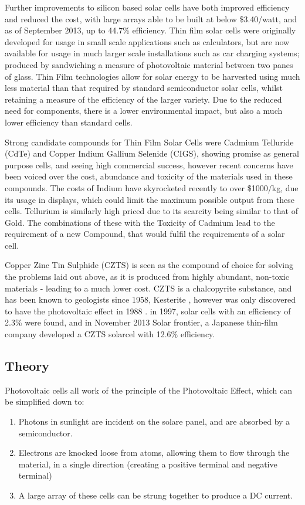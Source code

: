 Further improvements to silicon based solar cells have both improved efficiency and reduced the cost, with large arrays able to be built at below \$3.40/watt\citep{Fraunhofer-Gesellschaft2014}, and as of September 2013, up to 44.7\% efficiency.\citep{Ausick2014} Thin film solar cells were originally developed for usage in small scale applications such as calculators, but are now available for usage in much larger scale installations such as car charging systems; produced by sandwiching a measure of photovoltaic material between two panes of glass. Thin Film technologies allow for solar energy to be harvested using much less material than that required by standard semiconductor solar cells, whilst retaining a measure of the efficiency of the larger variety. Due to the reduced need for components, there is a lower environmental impact, but also a much lower efficiency than standard cells.

Strong candidate compounds for Thin Film Solar Cells were Cadmium Telluride (CdTe) and Copper Indium Gallium Selenide (CIGS), showing promise as general purpose cells, and seeing high commercial success, however recent concerns have been voiced over the cost, abundance and toxicity of the materials used in these compounds. The costs of Indium have skyrocketed recently to over \$1000/kg, due its usage in displays, which could limit the maximum possible output from these cells. Tellurium is similarly high priced due to its scarcity being similar to that of Gold. The combinations of these with the Toxicity of Cadmium lead to the requirement of a new Compound, that would fulfil the requirements of a solar cell.

Copper Zinc Tin Sulphide (CZTS) is seen as the compound of choice for solving the problems laid out above, as it is produced from highly abundant, non-toxic materials - leading to a much lower cost.\citep{Wadia2009} CZTS is a chalcopyrite substance, and has been known to geologists since 1958, Kesterite \citep{WebMineral2014}, however was only discovered to have the photovoltaic effect in 1988 \citep{Ito1988}. in 1997, solar cells with an efficiency of 2.3\% were found, and in November 2013 Solar frontier, a Japanese thin-film company developed a CZTS solarcel with 12.6\% efficiency.\citep{Wang2013}

\subsection{Theory}
	Photovoltaic cells all work of the principle of the Photovoltaic Effect, which can be simplified down to:

	\begin{enumerate}
	\item Photons in sunlight are incident on the solare panel, and are absorbed by a semiconductor.
	\item Electrons are knocked loose from atoms, allowing them to flow through the material, in a single direction (creating a positive terminal and negative terminal)
	\item A large array of these cells can be strung together to produce a DC current.
	\end{enumerate}
